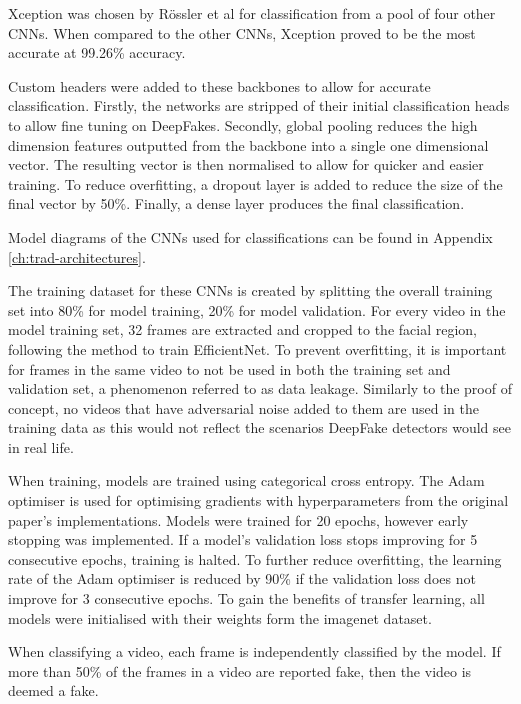 Xception was chosen by R\"{o}ssler et al for classification from a pool of four other CNNs. When compared to the other CNNs, Xception proved to be the most accurate at 99.26\% accuracy.

Custom headers were added to these backbones to allow for accurate classification. Firstly, the networks are stripped of their initial classification heads to allow fine tuning on DeepFakes. Secondly, global pooling reduces the high dimension features outputted from the backbone into a single one dimensional vector. The resulting vector is then normalised to allow for quicker and easier training. To reduce overfitting, a dropout layer is added to reduce the size of the final vector by 50\%. Finally, a dense layer produces the final classification.

Model diagrams of the CNNs used for classifications can be found in Appendix \ref{ch:trad-architectures}.

The training dataset for these CNNs is created by splitting the overall training set into 80\% for model training, 20\% for model validation. For every video in the model training set, 32 frames are extracted and cropped to the facial region, following the method to train EfficientNet\cite{bonettini2021video}. To prevent overfitting, it is important for frames in the same video to not be used in both the training set and validation set, a phenomenon referred to as data leakage. Similarly to the proof of concept, no videos that have adversarial noise added to them are used in the training data as this would not reflect the scenarios DeepFake detectors would see in real life.

When training, models are trained using categorical cross entropy. The Adam\cite{kingma2014adam} optimiser is used for optimising gradients with hyperparameters from the original paper's implementations. Models were trained for 20 epochs, however early stopping was implemented. If a model's validation loss stops improving for 5 consecutive epochs, training is halted. To further reduce overfitting, the learning rate of the Adam optimiser is reduced by 90\% if the validation loss does not improve for 3 consecutive epochs. To gain the benefits of transfer learning, all models were initialised with their weights form the imagenet\cite{deng2009imagenet} dataset.

When classifying a video, each frame is independently classified by the model. If more than 50\% of the frames in a video are reported fake, then the video is deemed a fake.

